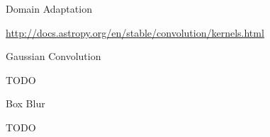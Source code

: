 \chap Domain Adaptation

\url{http://docs.astropy.org/en/stable/convolution/kernels.html}

\sec Gaussian Convolution

TODO

\sec Box Blur

TODO
